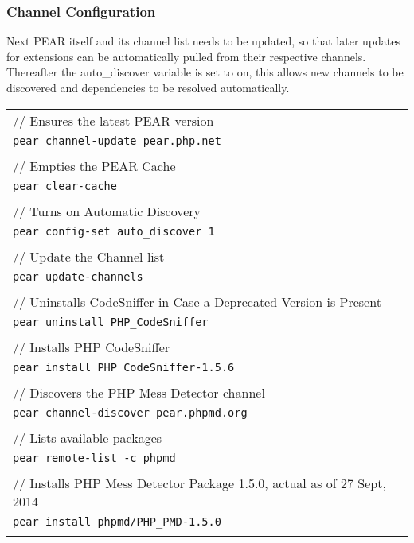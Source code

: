 \newpage
\subsubsection{Channel Configuration}

Next PEAR itself and its channel list needs to be updated, so that later updates for extensions can be automatically pulled from their respective channels. Thereafter the auto\_discover variable is set to on, this allows new channels to be discovered and dependencies to be resolved automatically.\\


\begin{tabular}{l}
	// Ensures the latest PEAR version\\
	\texttt{pear channel-update pear.php.net}\\
	\\
	// Empties the PEAR Cache\\
	\texttt{pear clear-cache}\\
	\\
	// Turns on Automatic Discovery\\
	\texttt{pear config-set auto\_discover 1}\\
	\\
	// Update the Channel list\\
	\texttt{pear update-channels}\\
	\\
	// Uninstalls CodeSniffer in Case a Deprecated Version is Present\\
	\texttt{pear uninstall PHP\_CodeSniffer}\\
	\\
	// Installs PHP CodeSniffer\\
	\texttt{pear install PHP\_CodeSniffer-1.5.6}\\
	\\
	// Discovers the PHP Mess Detector channel\\
	\texttt{pear channel-discover pear.phpmd.org}\\
	\\
	// Lists available packages\\
	\texttt{pear remote-list -c phpmd}\\
	\\
	// Installs PHP Mess Detector Package 1.5.0, actual as of 27 Sept, 2014\\
	\texttt{pear install phpmd/PHP\_PMD-1.5.0}\\ \\
\end{tabular}

